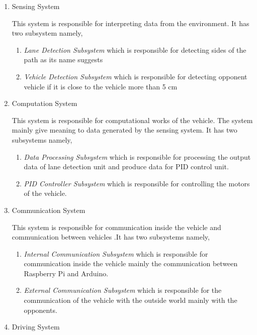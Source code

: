 \documentclass[a4paper,12pt]{article}
\begin{document}
	\begin{enumerate}
		\item Sensing System
			
			This system is responsible for interpreting data from the environment. It has two subsystem namely,
			
			\begin{enumerate}
				\item \textit{Lane Detection Subsystem} which is responsible for detecting sides of the path as its name suggests
				\item \textit{Vehicle Detection Subsystem} which is responsible for detecting opponent vehicle if it is close to the vehicle more than 5 cm
			\end{enumerate}
		
		\item Computation System
		
			This system is responsible for computational works of the vehicle. The system mainly give meaning to data generated by the sensing system. It has two subsystems namely,
			
			\begin{enumerate}
				\item \textit{Data Processing Subsystem} which is responsible for processing the output data of lane detection unit and produce data for PID control unit.
				\item \textit{PID Controller Subsystem} which is responsible for controlling the motors of the vehicle.
			\end{enumerate}
			
		\item Communication System	
		
		This system is responsible for communication inside the vehicle and communication between vehicles .It has two subsystems namely,
			
			\begin{enumerate}
				\item \textit{Internal Communication Subsystem} which is responsible for communication inside the vehicle mainly the communication between Raspberry Pi and Arduino.						\item \textit{External Communication Subsystem} which is responsible for the communication of the vehicle with the outside world mainly with the opponents.
			\end{enumerate}
		
		\item Driving System
		

\end{enumerate}
\end{document}
